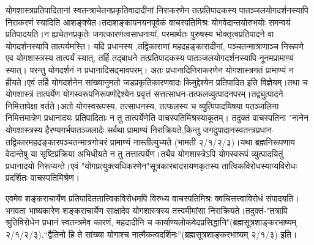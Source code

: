 {योगशास्त्रप्रतिपादितानां स्वतन्त्राचेतनप्रकृतिवादादीनां निराकरणेन तत्प्रतिपादकस्य पातञ्जलयोगदर्शनस्यापि निराकरणं स्यादिति आशङ्क्येत।तदाशङ्कापनयनपूर्वकं वाचस्पतिमिश्रः योगवेदान्तयोरुभयोः समन्वयं प्रतिपादयति।न ह्यचेतनप्रकृतेः जगत्कारणत्वसाधनायां, परमार्थतः पुरुषस्य भोक्तृत्वप्रतिपादने वा योगदर्शनस्यापि तात्पर्यमस्ति। यदि प्रधानस्य ,तद्विकाराणां महदहङ्कारादीनां, पञ्चतन्मात्राणाञ्च निरूपणे एव योगशास्त्रस्य तात्पर्यं स्यात्, तर्हि तद्बाधने तत्प्रतिपादकस्य पातञ्जलयोगदर्शनस्यापि नूनमप्रामाण्यं स्यात्। परन्तु योगदर्शनं न प्रधानादिसद्भावपरम्। अतः प्रधानादिनिराकरणेन योगशास्त्रगतं प्रामाण्यं न हीयते।एवं तर्हि योगदर्शनेन सांख्यानुमतो जडप्रकृतिकारणवादः किमुद्देश्येन प्रतिपादित इति विज्ञेयम्।तथा च योगशास्त्रं तात्पर्येण योगस्वरूपनिरूपणोद्देश्येन प्रवृत्तं सत्तत्साधन-तत्फलव्युत्पादनपरम्।तद्व्युत्पादने निमित्तापेक्षा वर्तते।अतो योगस्वरूपस्य, तत्साधनस्य, तत्फलस्य च व्युत्पिपादयिषया पतञ्जलिना निमित्तमात्रेण प्रधानादयः प्रतिपादिताः न तु तात्पर्येणेति वाचस्पतिमिश्रस्याकूतम्। तदुक्तं वाचस्पतिना "नानेन योगशास्त्रस्य हैरण्यगर्भपातञ्जलादेः सर्वथा प्रामाण्यं निराक्रियते,किन्तु जगदुपादानस्वतन्त्रप्रधान-तद्विकारमहदङ्कारपञ्चतन्मात्रगोचरं प्रामाण्यं नास्तीत्युच्यते (भामती २/१/२/३)।यथा ब्रह्मनिरूपणाय वेदान्तेषु या सृष्टिप्रक्रिया अभिधीयते न तु तत्तात्पर्येण।तथैव योगशास्त्रेऽपि योगस्वरूपं व्युत्पादयितुं प्रधानादयो निरूप्यन्ते।एवं "योगप्रत्युक्त्यधिकरणेन"सूत्रकारबादरायणकृतस्य तात्विकविरोधस्याप्यविरोधः प्रदर्शितः वाचस्पतिमिश्रेण।

एवमेव शङ्कराचार्येण प्रतिपादिततात्त्विकविरोधमपि विरुध्य वाचस्पतिमिश्रः क्वचित्तत्त्वाविरोधं संपादयति।भगवता भाष्यकारेण शङ्कराचार्येण साक्षादेव योगशास्त्रस्य तत्त्वमीमांसा निराक्रियते।तदुक्तं-"तत्रापि श्रुतिविरोधेन प्रधानं स्वतन्त्रमेव कारणं, महदादीनि च कार्याण्यलोकवेदप्रसिद्धानि"(ब्रह्मसूत्रशाङ्करभाष्यम् २/१/२/३),“द्वैतिनो हि ते सांख्या योगाश्च नात्मैकत्वदर्शिनः”(ब्रह्मसूत्रशाङ्करभाष्यम् २/१/३) इति।

}
